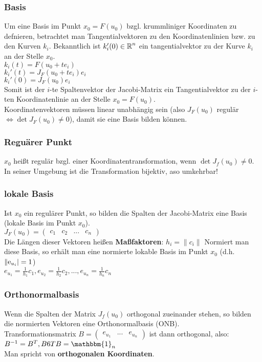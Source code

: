 \documentclass[german]{latex4ei/latex4ei_sheet}
\begin{document}
\subsubsection{Basis}
Um eine Basis im Punkt $x_0 = F(u_0)$ bzgl. krummliniger Koordinaten zu defnieren, betrachtet man Tangentialvektoren zu den Koordinatenlinien bzw. zu den Kurven $k_i$. Bekanntlich ist $k_i'(0)\in \operatorname{\mathbb R}^n$ ein tangentialvektor zu der Kurve $k_i$ an der Stelle $x_0$.\\
$k_i(t)=F(u_0+t e_i)$\\
$k_i'(t)=J_F(u_0+t e_i)e_i$\\
$k_i'(0)=J_F(u_0)e_i$\\
Somit ist der $i$-te Spaltenvektor der Jacobi-Matrix ein Tangentialvektor zu der $i$-ten Koordinatenlinie an der Stelle $x_0=F(u_0)$.\\
Koordinatenvektoren m\"ussen linear unabh\"angig sein (also $J_F(u_0)$ regul\"ar $\Leftrightarrow \det J_F(u_0)\neq 0$), damit sie eine Basis bilden k\"onnen.

\subsubsection{Regu\"arer Punkt}
$x_0$ hei\ss{}t regul\"ar bzgl. einer Koordinatentransformation, wenn $\det J_f(u_0) \neq 0$. In seiner Umgebung ist die Transformation bijektiv, aso umkehrbar!\\

\subsubsection{lokale Basis}
Ist $x_0$ ein regul\"arer Punkt, so bilden die Spalten der Jacobi-Matrix eine Basis (lokale Basis im Punkt $x_0$).\\
$J_F(u_0)=\begin{pmatrix}
c_1 & c_2 & ... & c_n
\end{pmatrix}$\\
Die L\"angen dieser Vektoren hei\ss{}en \textbf{Ma\ss{}faktoren}: $h_i=\|c_i\|$
Normiert man diese Basis, so erh\"alt man eine normierte lokable Basis im Punkt $x_0$ (d.h. $\|\mathrm{e}_{u_i}|=1$)\\
$e_{u_1}=\frac{1}{h_1}c_1, e_{u_2}=\frac{1}{h_2}c_2,..., e_{u_n}=\frac{1}{h_n}c_n$

\subsubsection{Orthonormalbasis}
Wenn die Spalten der Matrix $J_f(u_0)$ orthogonal zueinander stehen, so bilden die normierten Vektoren eine Orthonormalbasis (ONB).\\
Transformationsmatrix $B=\begin{pmatrix}
e_{u_1} & ... & e_{u_n}
\end{pmatrix} $ ist dann orthogonal, also: $B^{-1}=B^T, B6T B=\mathbbm{1}_n$\\
Man spricht von \textbf{orthogonalen Koordinaten}.\\
\end{document}

